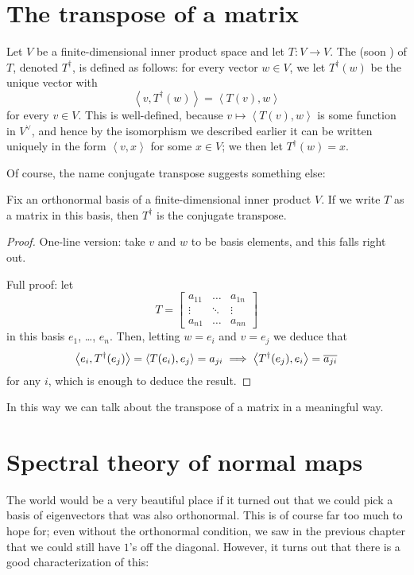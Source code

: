 \section{The transpose of a matrix}
Let $V$ be a finite-dimensional inner product space and let $T : V \to V$.
The  (soon ) of $T$, denoted $T^\dagger$,
is defined as follows: for every vector $w \in V$, we let $T^\dagger(w)$ be the unique vector with
\[ \left< v, T^\dagger(w) \right> = \left< T(v), w \right> \]
for every $v \in V$.
This is well-defined, because $v \mapsto \left< T(v), w \right>$ is some function in $V^\vee$,
and hence by the isomorphism we described earlier it can be written uniquely in the form $\left< v, x \right>$
for some $x \in V$; we then let $T^\dagger(w) = x$.

Of course, the name conjugate transpose suggests something else:
\begin{theorem}
	Fix an orthonormal basis of a finite-dimensional inner product $V$.
	If we write $T$ as a matrix in this basis, then $T^\dagger$ is the conjugate transpose.
\end{theorem}
\begin{proof}
	One-line version: take $v$ and $w$ to be basis elements, and this falls right out.

	Full proof: let
	\[ T = \begin{bmatrix}
			a_{11} & \dots & a_{1n} \\
			\vdots & \ddots & \vdots \\
			a_{n1} & \dots & a_{nn}
		\end{bmatrix} \]
	in this basis $e_1$, \dots, $e_n$.
	Then, letting $w = e_i$ and $v = e_j$ we deduce that
	\[ \left< e_i, T^\dagger(e_j) \right> = \left< T(e_i) , e_j\right> = a_{ji}
		\implies
		\left< T^\dagger(e_j), e_i \right> = \overline{a_{ji}} \]
	for any $i$, which is enough to deduce the result.
\end{proof}

In this way we can talk about the transpose of a matrix in a meaningful way.

\section{Spectral theory of normal maps}
The world would be a very beautiful place if it turned out
that we could pick a basis of eigenvectors that was also orthonormal.
This is of course far too much to hope for; even without the orthonormal condition,
we saw in the previous chapter that we could still have $1$'s off the diagonal.
However, it turns out that there is a good characterization of this:

